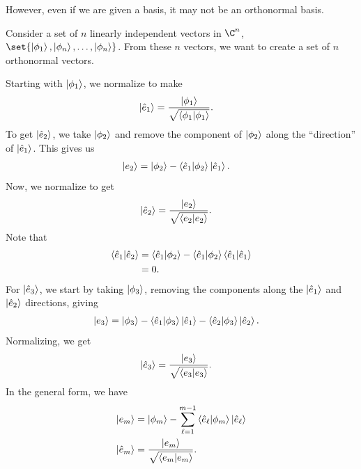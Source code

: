 \documentclass[10pt]{mypackage}
\begin{document}
However, even if we are given a basis, it may not be an orthonormal basis.
\begin{method}
Consider a set of $n$ linearly independent vectors in $\C^n$, $\set{\ket{\phi_{1}},\ket{\phi_n},\dots,\ket{\phi_{n}}}$. From these $n$ vectors, we want to create a set of $n$ orthonormal vectors.\newline

Starting with $ \ket{\phi_1} $, we normalize to make
\begin{align*}
  \ket{ \hat{e}_1 } &= \frac{\ket{\phi_1}}{\sqrt{\braket{\phi_1}{\phi_1}}}.
\end{align*}
To get $ \ket{\hat{e}_2} $, we take $\ket{\phi_2}$ and remove the component of $\ket{\phi_2}$ along the ``direction'' of $\ket{\hat{e}_1}$. This gives us
\begin{align*}
  \ket{e_2} &= \ket{\phi_2}  - \braket{\hat{e}_1}{\phi_2}\ket{\hat{e}_1}.
\end{align*}
Now, we normalize to get
\begin{align*}
  \ket{\hat{e}_2} &= \frac{ \ket{e_2} }{\sqrt{\braket{e_2}{e_2}}}.
\end{align*}
Note that
\begin{align*}
  \braket{\hat{e}_1}{\hat{e}_2} &= \braket{\hat{e}_1}{\phi_2} - \braket{\hat{e}_1}{\phi_2}\braket{\hat{e}_1}{\hat{e}_1}\\
                                &= 0.
\end{align*}
For $ \ket{ \hat{e}_3 } $, we start by taking $\ket{\phi_3}$, removing the components along the $\ket{\hat{e}_1}$ and $\ket{\hat{e}_2}$ directions, giving
\begin{align*}
  \ket{e_3} &= \ket{\phi_3} - \braket{\hat{e}_1}{\phi_3}\ket{\hat{e}_1} - \braket{\hat{e}_2}{\phi_3}\ket{\hat{e}_2}.
\end{align*}
Normalizing, we get
\begin{align*}
  \ket{\hat{e}_3} &= \frac{\ket{e_3}}{\sqrt{\braket{e_3}{e_3}}}.
\end{align*}
In the general form, we have
\begin{align*}
  \ket{e_m} &= \ket{\phi_m} - \sum_{\ell=1}^{m-1}\braket{\hat{e}_{\ell}}{\phi_m}\ket{\hat{e}_{\ell}}\\
  \ket{\hat{e}_m} &= \frac{\ket{e_m}}{\sqrt{\braket{e_m}{e_m}}}.
\end{align*}
\end{method}
\end{document}
